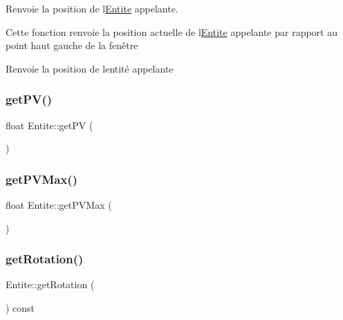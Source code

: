 Renvoie la position de l\textquotesingle{}\hyperlink{class_entite}{Entite} appelante. 

Cette fonction renvoie la position actuelle de l\textquotesingle{}\hyperlink{class_entite}{Entite} appelante par rapport au point haut gauche de la fenêtre \begin{DoxyReturn}{Renvoie}
la position de l\textquotesingle{}entité appelante 
\end{DoxyReturn}
\mbox{\label{class_entite_ad6e34d82273566ceb7680a5d783af504}} 
\subsubsection{\texorpdfstring{get\+P\+V()}{getPV()}}
{\footnotesize\ttfamily float Entite\+::get\+PV (\begin{DoxyParamCaption}{ }\end{DoxyParamCaption})\hspace{0.3cm}{\ttfamily [inline]}}

\mbox{\label{class_entite_ac55a0e2b2667fda98e47d7057675d295}} 
\subsubsection{\texorpdfstring{get\+P\+V\+Max()}{getPVMax()}}
{\footnotesize\ttfamily float Entite\+::get\+P\+V\+Max (\begin{DoxyParamCaption}{ }\end{DoxyParamCaption})\hspace{0.3cm}{\ttfamily [inline]}}

\mbox{\label{class_entite_a7f19439f7e7a5028f4b26eff21683de9}} 
\subsubsection{\texorpdfstring{get\+Rotation()}{getRotation()}}
{\footnotesize\ttfamily Entite\+::get\+Rotation (\begin{DoxyParamCaption}{ }\end{DoxyParamCaption}) const}



